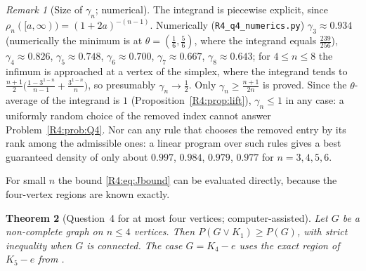 \documentclass[11pt]{amsart}
\newtheorem{theorem}{Theorem}[section]
\theoremstyle{definition}
\theoremstyle{remark}
\newtheorem{remark}[theorem]{Remark}
\begin{document}
\begin{remark}[Size of $\gamma_n$; numerical]\label{R4:rem:gamma}
The integrand is piecewise explicit, since
$\rho_n([a,\infty))=(1+2a)^{-(n-1)}$.  Numerically
(\texttt{R4\_\allowbreak{}q4\_\allowbreak{}numerics.py}) $\gamma_3\approx0.934$ (numerically the
minimum is at $\theta=(\frac16,\frac56)$, where the integrand equals
$\frac{239}{256}$),
$\gamma_4\approx0.826$, $\gamma_5\approx0.748$, $\gamma_6\approx0.700$,
$\gamma_7\approx0.667$, $\gamma_8\approx0.643$; for $4\le n\le8$ the
infimum is approached at a vertex of the simplex, where the integrand
tends to $\frac{n+1}2\bigl(\frac{1-3^{1-n}}{n-1}+\frac{3^{1-n}}n\bigr)$, so
presumably $\gamma_n\to\frac12$.  Only $\gamma_n\ge\frac{n+1}{2n}$ is
proved.  Since the $\theta$-average of the integrand is $1$
(Proposition~\ref{R4:prop:lift}), $\gamma_n\le1$ in any case: a uniformly
random choice of the removed index cannot answer
Problem~\ref{R4:prob:Q4}.  Nor can any rule that chooses the removed
entry by its rank among the admissible ones: a linear program over such
rules gives a best guaranteed density of only about $0.997$, $0.984$,
$0.979$, $0.977$ for $n=3,4,5,6$.
\end{remark}

For small $n$ the bound \eqref{R4:eq:Jbound} can be evaluated directly,
because the four-vertex regions are known exactly.

\begin{theorem}[Question~4 for at most four vertices; computer-assisted]
\label{R4:thm:Q4small}
Let $G$ be a non-complete graph on $n\le4$ vertices.  Then
$P(G\vee K_1)\ge P(G)$, with strict inequality when $G$ is connected.
The case $G=K_4-e$ uses the exact region of $K_5-e$ from \cite{K-015}.
\end{theorem}
\end{document}
